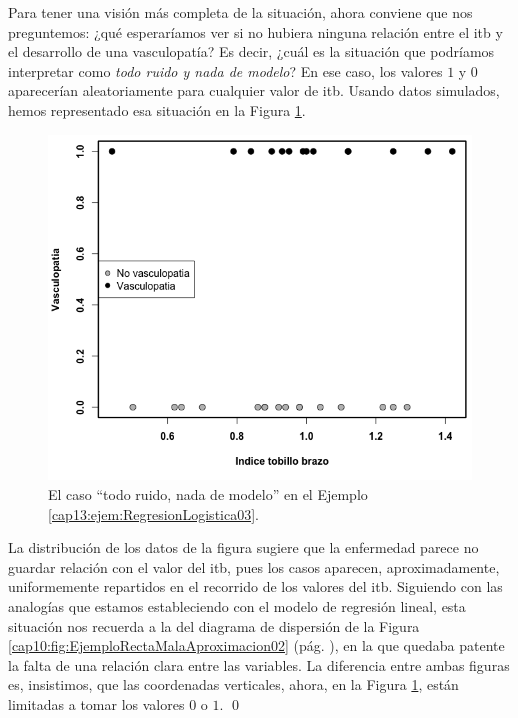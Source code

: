 \begin{ejemplo}
Para tener una visión más completa de la situación, ahora conviene que nos preguntemos: ¿qué esperaríamos ver si no hubiera ninguna relación entre el itb y el desarrollo de una vasculopatía? Es decir, ¿cuál es la situación que podríamos interpretar como {\em todo ruido y nada de modelo}? En ese caso, los valores $1$ y $0$ aparecerían aleatoriamente para cualquier valor de itb. Usando datos simulados, hemos representado esa situación en la Figura \ref{cap13:fig:RegresionLogisticaNoRelacion}.
\begin{figure}[h!]
\begin{center}
    \includegraphics[width=13cm]{../fig/Cap13-VasculopatiaNoRel.png}
\end{center}
\caption{El caso ``todo ruido, nada de modelo'' en el Ejemplo \ref{cap13:ejem:RegresionLogistica03}.}
\label{cap13:fig:RegresionLogisticaNoRelacion}
\end{figure}
La distribución de los datos de la figura sugiere que la enfermedad parece no guardar relaci\'on con el valor del itb, pues los casos aparecen, aproximadamente, uniformemente repartidos en el recorrido de los valores del itb. Siguiendo con las analogías que estamos estableciendo con el modelo de regresión lineal, esta situación nos recuerda a la del diagrama de dispersión de la Figura \ref{cap10:fig:EjemploRectaMalaAproximacion02} (pág. \pageref{cap10:fig:EjemploRectaMalaAproximacion02}), en la que quedaba patente la falta de una relación clara entre las variables. La diferencia entre ambas figuras es, insistimos, que las coordenadas verticales, ahora, en la Figura \ref{cap13:fig:RegresionLogisticaNoRelacion}, están limitadas a tomar los valores $0$ o $1$.
\qed
\end{ejemplo}

